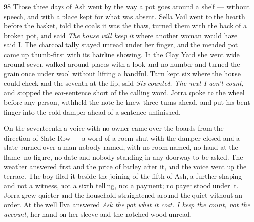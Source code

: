 
\scenebreak


\scenebreak


\scenebreak

\CRtailpiece
\begin{CRchronicle}{98}
Those three days of Ash went by the way a pot goes around a shelf — without speech, and with a place kept for what was absent. Sella Vail went to the hearth before the basket, told the coals it was the thaw, turned them with the back of a broken pot, and said \emph{The house will keep it} where another woman would have said I. The charcoal tally stayed unread under her finger, and the mended pot came up thumb-first with its hairline showing. In the Clay Yard she went wide around seven walked-around places with a look and no number and turned the grain once under wool without lifting a handful. Tarn kept six where the house could check and the seventh at the lip, said \emph{Six counted. The next I don’t count}, and stopped the ear-sentence short of the calling word. Jorra spoke to the wheel before any person, withheld the note he knew three turns ahead, and put his bent finger into the cold damper ahead of a sentence unfinished.

On the seventeenth a voice with no owner came over the boards from the direction of Slate Row — a word of a room shut with the damper closed and a slate burned over a man nobody named, with no room named, no hand at the flame, no figure, no date and nobody standing in any doorway to be asked. The weather answered first and the price of barley after it, and the voice went up the terrace. The boy filed it beside the joining of the fifth of Ash, a further shaping and not a witness, not a sixth telling, not a payment; no payer stood under it. Jorra grew quieter and the household straightened around the quiet without an order. At the well Ilva answered \emph{Ask the pot what it cost. I keep the count, not the account}, her hand on her sleeve and the notched wood unread.


\end{CRchronicle}
